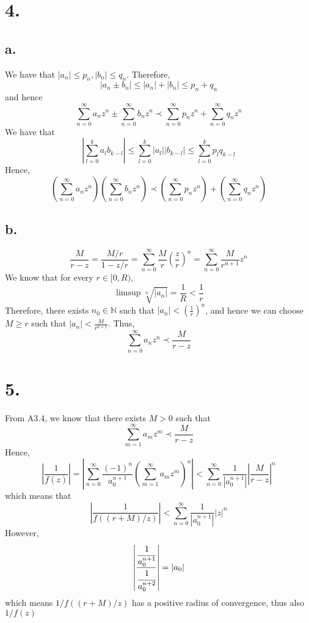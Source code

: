 \documentclass[11pt]{article}
\begin{document}
\newpage
\section*{4.}
\subsection*{a.}
We have that $|a_n| \le p_n, |b_n| \le q_n$. Therefore, 
\[
    |a_n \pm b_n| \le |a_n| + |b_n| \le p_n + q_n      
\]
and hence 
\[
    \sum_{n=0}^\infty a_n z^n \pm \sum_{n=0}^\infty b_n z^n \prec \sum_{n=0}^\infty p_n z^n + \sum_{n=0}^\infty q_n z^n     
\]
We have that 
\[
    \left|\sum_{l=0}^k a_l b_{k-l} \right| \le \sum_{l=0}^k |a_l| |b_{k-l}| \le \sum_{l=0}^k p_l q_{k-l} 
\]
Hence, 
\[
    \left(\sum_{n=0}^\infty a_n z^n \right) \left( \sum_{n=0}^\infty b_n z^n \right) \prec \left(\sum_{n=0}^\infty p_n z^n\right) + \left(\sum_{n=0}^\infty q_n z^n\right)     
\]
\subsection*{b.}
\[
    \frac{M}{r - z} = \frac{M/r}{1 - z/r} = \sum_{n=0}^\infty \frac{M}{r} \left(\frac{z}{r}\right)^n = \sum_{n=0}^\infty \frac{M}{r^{n+1}} z^n
\]
We know that for every $r \in [0,R)$, 
\[
    \limsup \sqrt[n]{|a_n|} = \frac{1}{R} < \frac{1}{r} 
\]
Therefore, there exists $n_0 \in \mathbb{N}$ such that $|a_n| < \left( \frac{1}{r} \right)^n$,
and hence we can choose $M \ge r$ such that $|a_n| < \frac{M}{r^{n+1}}$. Thus, 
\[
    \sum_{n=0}^\infty a_n z^n \prec \frac{M}{r-z}    
\]
\newpage
\section*{5.}
From A3.4, we know that there exists $M>0$ such that 
\[
    \sum_{m=1}^\infty a_m z^m \prec \frac{M}{r - z}    
\]
Hence, 
\[
    \left|\frac{1}{f(z)} \right| = \left| \sum_{n=0}^\infty \frac{(-1)^n}{a_0^{n+1}} \left( \sum_{m=1}^\infty a_m z^m \right)^n \right| < \sum_{n=0}^\infty \frac{1}{\left| a_0^{n+1} \right|} \left| \frac{M}{r-z} \right|^n
\]
which means that
\[
    \left| \frac{1}{f((r+M)/z)} \right| < \sum_{n=0}^\infty \frac{1}{\left| a_0^{n+1} \right|} |z|^n
\]
However, 
\[
    \left| \frac{\cfrac{1}{a_0^{n+1}}}{\cfrac{1}{a_0^{n+2}}} \right| = |a_0|    
\]
which means $1/f((r+M)/z)$ has a positive radius of convergence, thus also $1/f(z)$
\end{document}

